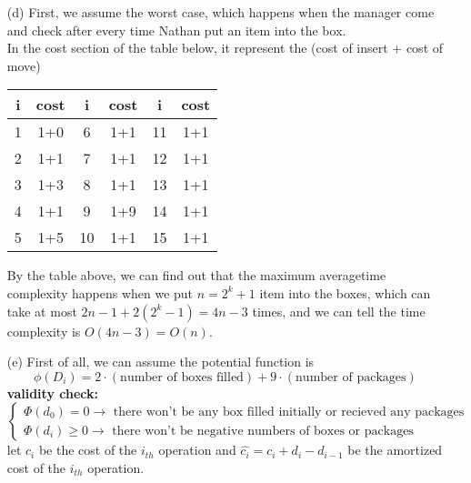 \documentclass{homework}
\begin{document}
\begin{itemize}
    \item[(d)] %
    First, we assume the worst case, which happens when the manager come and check after every time Nathan put an item into the box.\\
    In the cost section of the table below, it represent the (cost of insert + cost of move)\\
    \begin{table}[H]
        \centering
        \begin{tabular}{|c|c|c|c|c|c|}
            \hline
            i  & cost & i  & cost & i  & cost \\\hline
            1  & 1+0  & 6  & 1+1  & 11 & 1+1  \\\hline
            2  & 1+1  & 7  & 1+1  & 12 & 1+1  \\\hline
            3  & 1+3  & 8  & 1+1  & 13 & 1+1  \\\hline
            4  & 1+1  & 9  & 1+9  & 14 & 1+1  \\\hline
            5  & 1+5  & 10 & 1+1  & 15 & 1+1  \\\hline
        \end{tabular}
    \end{table}
    By the table above, we can find out that the maximum averagetime complexity happens when we put $n=2^k+1$ item into the boxes, which can take at most $2n-1+2(2^k-1)=4n-3$ times, and we can tell the time complexity is $O(4n-3)=O(n)$.

    \item[(e)]
    First of all, we can assume the potential function is \\
    \[\phi(D_i)= 2\cdot(\text{number of boxes filled}) + 9\cdot(\text{number of packages})\]
    \textbf{validity check:}\\
    $\begin{cases}
        \Phi(d_0)   = 0 \rightarrow\text{ there won't be any box filled initially or recieved any packages}\\
        \Phi(d_i)\geq 0 \rightarrow\text{ there won't be negative numbers of boxes or packages}
    \end{cases}$\\
    let $c_i$ be the cost of the $i_{th}$ operation and $\hat{c_i} = c_i + d_i - d_{i-1}$ be the amortized cost of the $i_{th}$ operation.\\


\end{itemize}
\end{document}
